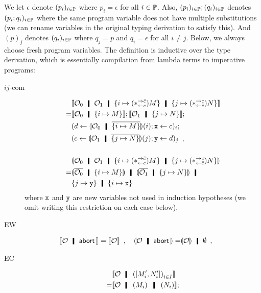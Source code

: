 We let $\epsilon$ denote $(p_i)_{i\in\mathbb{P}}$ where $p_i=\epsilon$
for all $i\in\mathbb{P}$.
Also, $(p_i)_{i\in\mathbb{P}}; (q_i)_{i\in\mathbb{P}}$ denotes
$(p_i; q_i)_{i\in\mathbb{P}}$ where the
same program variable does not have multiple substitutions
(we can rename variables in the original typing derivation to satisfy
this).
And $(p)_j$ denotes $(q_i)_{i\in\mathbb{P}}$ where $q_j = p$ and $q_i =
\epsilon$ for all $i\neq j$.
Below, we always choose fresh program variables.
The definition is inductive over the type derivation, which is
essentially compilation from lambda terms to imperative programs:
\begin{description}
 \item[$ij$-com]
      \begin{align*}
       &\semo{\hypert_0\hmid\hypert_1\hmid \imapsto{(\comodL) M}\hmid
       \jmapsto{(\comodR) N}} \\
       =& \semo{\hypert_0\hmid \imapsto{M}};
       \semo{\hypert_1\hmid \jmapsto{N}};\\
       &(d\leftarrow \semoi{\hypert_0\hmid\overline{\imapsto{M}}}(i); \p
       x\leftarrow c)_i; \\
       &(c\leftarrow \semoi{\hypert_1\hmid\overline{\jmapsto{N}}}(j); \p
       y\leftarrow d)_j\enspace,\\ \\
       &\semoi{\hypert_0\hmid\hypert_1\hmid \imapsto{(\comodL) M}\hmid
       \jmapsto{(\comodR) N}} \\=&
       \semoi{\overline{\hypert_0}\hmid \imapsto{M}} \hmid
       \semoi{\overline{\hypert_1}\hmid \jmapsto{N}}
       \hmid\\& \{j\mapsto\p y\}\hmid \{i\mapsto \p x\}
      \end{align*}
      where $\texttt{x}$ and $\texttt{y}$ are new variables not used in induction
      hypotheses (we omit writing this restriction on each case below),
 \item[EW] \begin{align*}
 \semo{\hypert\hmid \abort}=\semo{\hypert}\enspace,\quad
 \semoi{\hypert\hmid\abort}=&\semoi{\hypert}\hmid \emptyset\enspace,\quad
	   \end{align*}
 \item[EC]
      \begin{align*}
         &\semo{ \hypert \hmid \left(\cotuple{M'_i,N'_i}\right)_{i\in I}
       } \\
       =& \semo{\hypert\hmid \left(M_i\right) \hmid
       \left(N_i\right)}; \\

\end{align*}
\end{description}
